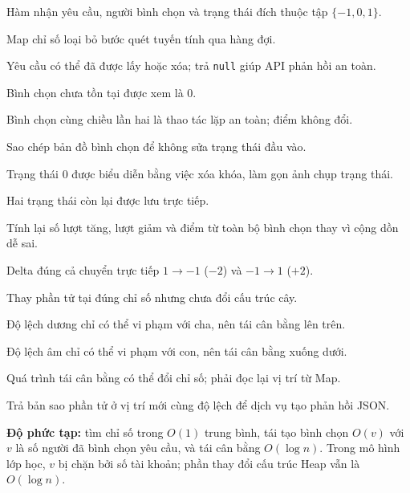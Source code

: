 \documentclass[12pt,a4paper,twoside,openright]{report}
\newcommand{\code}[1]{\texttt{#1}}
\begin{document}
\begin{description}[leftmargin=1.2cm,labelwidth=0.8cm,style=multiline,
  font=\ttfamily\bfseries,itemsep=2pt]
  \item[D1] Hàm nhận yêu cầu, người bình chọn và trạng thái đích thuộc tập $\{-1,0,1\}$.
  \item[D2] Map chỉ số loại bỏ bước quét tuyến tính qua hàng đợi.
  \item[D3] Yêu cầu có thể đã được lấy hoặc xóa; trả \code{null} giúp API phản hồi an toàn.
  \item[D4] Bình chọn chưa tồn tại được xem là 0.
  \item[D5] Bình chọn cùng chiều lần hai là thao tác lặp an toàn; điểm không đổi.
  \item[D6] Sao chép bản đồ bình chọn để không sửa trạng thái đầu vào.
  \item[D7] Trạng thái 0 được biểu diễn bằng việc xóa khóa, làm gọn ảnh chụp trạng thái.
  \item[D8] Hai trạng thái còn lại được lưu trực tiếp.
  \item[D9] Tính lại số lượt tăng, lượt giảm và điểm từ toàn bộ bình chọn thay vì cộng dồn dễ sai.
  \item[D10] Delta đúng cả chuyển trực tiếp $1\to-1$ ($-2$) và $-1\to1$ ($+2$).
  \item[D11] Thay phần tử tại đúng chỉ số nhưng chưa đổi cấu trúc cây.
  \item[D12] Độ lệch dương chỉ có thể vi phạm với cha, nên tái cân bằng lên trên.
  \item[D13] Độ lệch âm chỉ có thể vi phạm với con, nên tái cân bằng xuống dưới.
  \item[D14] Quá trình tái cân bằng có thể đổi chỉ số; phải đọc lại vị trí từ Map.
  \item[D15] Trả bản sao phần tử ở vị trí mới cùng độ lệch để dịch vụ tạo phản hồi JSON.
\end{description}
\textbf{Độ phức tạp:} tìm chỉ số trong $O(1)$ trung bình, tái tạo bình chọn $O(v)$ với $v$
là số người đã bình chọn yêu cầu, và tái cân bằng $O(\log n)$. Trong mô hình lớp học, $v$
bị chặn bởi số tài khoản;
phần thay đổi cấu trúc Heap vẫn là $O(\log n)$.

\end{document}
